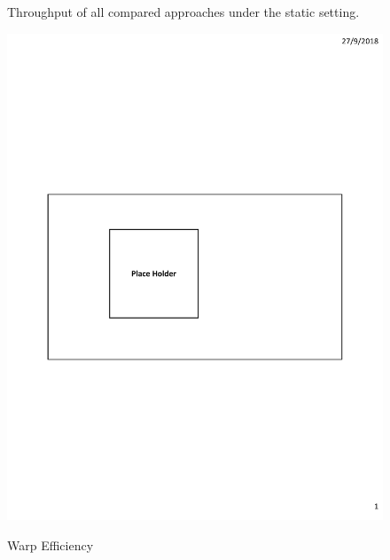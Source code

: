 \begin{figure}[h]
\begin{minipage}{0.45\linewidth}
	\centerline{}
	\end{minipage}
	\caption{Throughput of all compared approaches under the static setting.}
	\label{fig:static}
\end{figure}

\begin{figure}[h]
	\begin{minipage}{0.3\linewidth}\centering
		\includegraphics[width=\linewidth]{fig/PlaceHolder.pdf}
		\centerline{Warp Efficiency}
	\end{minipage}
	\hfill
	\begin{minipage}{0.3\linewidth}\centering

\end{minipage}
\end{figure}
